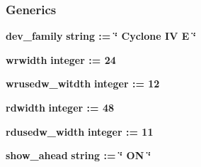 \subsubsection*{Generics}
 \begin{DoxyCompactItemize}
\item 
{\bf dev\+\_\+family} {\bfseries {\bfseries \textcolor{comment}{string}\textcolor{vhdlchar}{ }\textcolor{vhdlchar}{ }\textcolor{vhdlchar}{\+:}\textcolor{vhdlchar}{=}\textcolor{vhdlchar}{ }\textcolor{vhdlchar}{ }\textcolor{vhdlchar}{ }\textcolor{vhdlchar}{ }\textcolor{keyword}{\char`\"{} Cyclone I\+V E \char`\"{}}\textcolor{vhdlchar}{ }}}
\item 
{\bf wrwidth} {\bfseries {\bfseries \textcolor{comment}{integer}\textcolor{vhdlchar}{ }\textcolor{vhdlchar}{ }\textcolor{vhdlchar}{\+:}\textcolor{vhdlchar}{=}\textcolor{vhdlchar}{ }\textcolor{vhdlchar}{ } \textcolor{vhdldigit}{24} \textcolor{vhdlchar}{ }}}
\item 
{\bf wrusedw\+\_\+witdth} {\bfseries {\bfseries \textcolor{comment}{integer}\textcolor{vhdlchar}{ }\textcolor{vhdlchar}{ }\textcolor{vhdlchar}{\+:}\textcolor{vhdlchar}{=}\textcolor{vhdlchar}{ }\textcolor{vhdlchar}{ } \textcolor{vhdldigit}{12} \textcolor{vhdlchar}{ }}}
\item 
{\bf rdwidth} {\bfseries {\bfseries \textcolor{comment}{integer}\textcolor{vhdlchar}{ }\textcolor{vhdlchar}{ }\textcolor{vhdlchar}{\+:}\textcolor{vhdlchar}{=}\textcolor{vhdlchar}{ }\textcolor{vhdlchar}{ } \textcolor{vhdldigit}{48} \textcolor{vhdlchar}{ }}}
\item 
{\bf rdusedw\+\_\+width} {\bfseries {\bfseries \textcolor{comment}{integer}\textcolor{vhdlchar}{ }\textcolor{vhdlchar}{ }\textcolor{vhdlchar}{\+:}\textcolor{vhdlchar}{=}\textcolor{vhdlchar}{ }\textcolor{vhdlchar}{ } \textcolor{vhdldigit}{11} \textcolor{vhdlchar}{ }}}
\item 
{\bf show\+\_\+ahead} {\bfseries {\bfseries \textcolor{comment}{string}\textcolor{vhdlchar}{ }\textcolor{vhdlchar}{ }\textcolor{vhdlchar}{\+:}\textcolor{vhdlchar}{=}\textcolor{vhdlchar}{ }\textcolor{vhdlchar}{ }\textcolor{vhdlchar}{ }\textcolor{vhdlchar}{ }\textcolor{keyword}{\char`\"{} O\+N \char`\"{}}\textcolor{vhdlchar}{ }}}
\end{DoxyCompactItemize}

